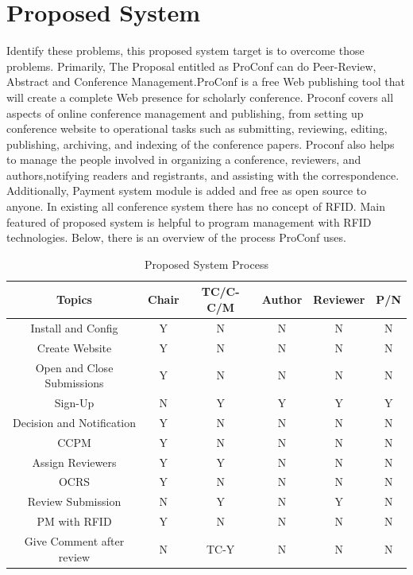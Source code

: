 \section{Proposed  System }
Identify these problems, this proposed system target is to overcome those problems. Primarily, The Proposal entitled as ProConf can do Peer-Review, Abstract and Conference Management.ProConf is a free Web publishing tool that will create a complete Web presence for scholarly conference.
Proconf covers all aspects of online conference management and publishing, from setting up conference website to operational tasks such as submitting, reviewing, editing, publishing, archiving, and indexing of the conference papers.
Proconf also helps to manage the people involved in organizing a conference, reviewers, and authors,notifying readers and registrants, and assisting with the correspondence. Additionally, Payment system module is added and free as open source to anyone. In existing all conference system there has no concept of RFID. Main featured of proposed system is helpful to program management with RFID technologies.\newline
Below, there is an overview of the process ProConf uses.
\begin{center}
\begin{table}[htbp]
   \begin{tabular}{|c|c|c|c|c|c|}
     \hline
     Topics &Chair &TC/C-C/M &Author & Reviewer & P/N \\\hline
     Install and Config &Y & N & N &N &N \\\hline
     Create Website & Y & N & N &N &N \\\hline
     Open and Close Submissions& Y & N & N &N &N \\\hline
     Sign-Up & N & Y & Y &Y &Y \\\hline
     Decision  and Notification & Y & N & N &N &N \\\hline
     CCPM & Y & N & N &N &N \\\hline
     Assign  Reviewers & Y & Y & N & N & N \\\hline
     OCRS & Y & N & N & N & N \\\hline
     Review Submission & N & Y & N & Y & N \\\hline
     PM with RFID  & Y & N & N & N & N \\\hline
     Give Comment after review  & N & TC-Y & N & N & N \\\hline
   \end{tabular}
   \caption[Proposed System Process.]{Proposed System Process}
	\label{tab:system process}

  \end{table}
  \end{center}







